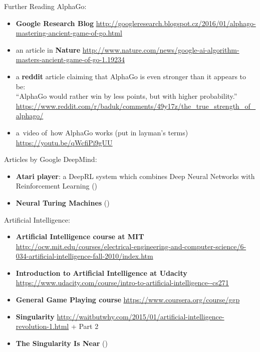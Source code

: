 \documentclass{beamer}
\begin{document}
  \begin{frame}[allowframebreaks]{Further Reading}
    \tiny
    AlphaGo:
    \begin{itemize}
      \item \textbf{Google Research Blog} \url{http://googleresearch.blogspot.cz/2016/01/alphago-mastering-ancient-game-of-go.html}
      \item an article in \textbf{Nature} \url{http://www.nature.com/news/google-ai-algorithm-masters-ancient-game-of-go-1.19234}
      \item a \textbf{reddit} article claiming that AlphaGo is even stronger than it appears to be: \\
        ``AlphaGo would rather win by less points, but with higher probability.'' \\
        \url{https://www.reddit.com/r/baduk/comments/49y17z/the_true_strength_of_alphago/}
      \item a~video of~how AlphaGo works (put in layman's terms) \url{https://youtu.be/qWcfiPi9gUU}
    \end{itemize}

    Articles by Google DeepMind:
    \begin{itemize}
      \item \textbf{Atari player}: a DeepRL system which combines Deep Neural Networks with Reinforcement Learning (\cite{Mnih2015human})
      \item \textbf{Neural Turing Machines} (\cite{Graves2014neural})
    \end{itemize}

    Artificial Intelligence:
    \begin{itemize}
      \item \textbf{Artificial Intelligence course at MIT} \url{http://ocw.mit.edu/courses/electrical-engineering-and-computer-science/6-034-artificial-intelligence-fall-2010/index.htm}
      \item \textbf{Introduction to Artificial Intelligence at Udacity} \url{https://www.udacity.com/course/intro-to-artificial-intelligence--cs271}
      \item \textbf{General Game Playing course} \url{https://www.coursera.org/course/ggp}
      \item \textbf{Singularity} \url{http://waitbutwhy.com/2015/01/artificial-intelligence-revolution-1.html} + Part 2
      \item \textbf{The Singularity Is Near} (\cite{Kurzweil2005singularity})
    \end{itemize}


\end{frame}
\end{document}
